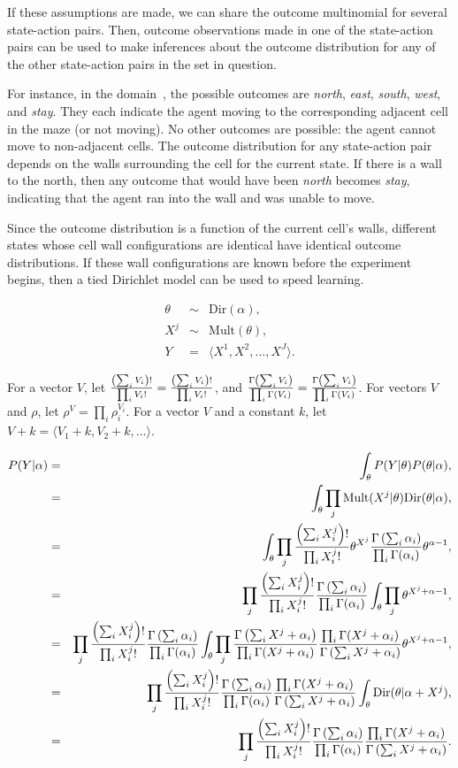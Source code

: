 If these assumptions are made, we can share the outcome multinomial for several state-action pairs. Then, outcome observations made in one of the state-action pairs can be used to make inferences about the outcome distribution for any of the other state-action pairs in the set in question.

For instance, in the  domain~\cite{leffler07}, the possible outcomes are \emph{north}, \emph{east}, \emph{south}, \emph{west}, and \emph{stay}. They each indicate the agent moving to the corresponding adjacent cell in the maze (or not moving). No other outcomes are possible: the agent cannot move to non-adjacent cells. The outcome distribution for any state-action pair depends on the walls surrounding the cell for the current state. If there is a wall to the north, then any outcome that would have been \emph{north} becomes \emph{stay}, indicating that the agent ran into the wall and was unable to move.

Since the outcome distribution is a function of the current cell's walls, different states whose cell wall configurations are identical have identical outcome distributions. If these wall configurations are known before the experiment begins, then a tied Dirichlet model can be used to speed learning.

\begin{eqnarray}
\theta &\sim& \mbox{Dir}(\alpha),\\
X^j &\sim& \mbox{Mult}(\theta),\\
Y &=& \langle X^1, X^2, ... , X^J \rangle.
\end{eqnarray}

For a vector $V$, let $\frac {\left(\sum_i V_i\right)!}{\prod_i V_i!} =\frac{\left(\sum_i V_i\right)!}{\prod_i V_i!}$, and $\frac {\Gamma\left(\sum_i V_i\right)}{\prod_i \Gamma(V_i)}=\frac{\Gamma\left(\sum_i V_i\right)}{\prod_i \Gamma(V_i)}$. For vectors $V$ and $\rho$, let $\rho^V=\prod_i \rho_i^{V_i}$. For a vector $V$ and a constant $k$, let $V+k=\langle V_1+k, V_2+k, ... \rangle$.

\begin{eqnarray}
P(Y|\alpha) &=& \int_\theta P(Y|\theta)P(\theta|\alpha),\\
&=& \int_\theta \prod_j \mbox{Mult}(X^j|\theta)\mbox{Dir}(\theta|\alpha),\\
&=& \int_\theta \prod_j \frac {\left(\sum_i X^j_i\right)!}{\prod_i X^j_i!} \theta^{X^j} \frac {\Gamma\left(\sum_i \alpha_i\right)}{\prod_i \Gamma(\alpha_i)} \theta^{\alpha-1},\\
&=& \prod_j \frac {\left(\sum_i X^j_i\right)!}{\prod_i X^j_i!} \frac {\Gamma\left(\sum_i \alpha_i\right)}{\prod_i \Gamma(\alpha_i)}  \int_\theta \prod_j \theta^{X^j+\alpha-1},\\
&=& \prod_j \frac {\left(\sum_i X^j_i\right)!}{\prod_i X^j_i!} \frac {\Gamma\left(\sum_i \alpha_i\right)}{\prod_i \Gamma(\alpha_i)}  \int_\theta \prod_j \frac {\Gamma\left(\sum_i X^j+\alpha_i\right)}{\prod_i \Gamma(X^j+\alpha_i)} \frac {\prod_i \Gamma(X^j+\alpha_i)}{\Gamma\left(\sum_i X^j+\alpha_i\right)} \theta^{X^j+\alpha-1},\\
&=& \prod_j \frac {\left(\sum_i X^j_i\right)!}{\prod_i X^j_i!} \frac {\Gamma\left(\sum_i \alpha_i\right)}{\prod_i \Gamma(\alpha_i)} \frac {\prod_i \Gamma(X^j+\alpha_i)}{\Gamma\left(\sum_i X^j+\alpha_i\right)} \int_\theta \mbox{Dir}(\theta|\alpha+X^j),\\
\label{models:eqn:tied-post}&=& \prod_j \frac {\left(\sum_i X^j_i\right)!}{\prod_i X^j_i!} \frac {\Gamma\left(\sum_i \alpha_i\right)}{\prod_i \Gamma(\alpha_i)} \frac {\prod_i \Gamma(X^j+\alpha_i)}{\Gamma\left(\sum_i X^j+\alpha_i\right)}.
\end{eqnarray}


